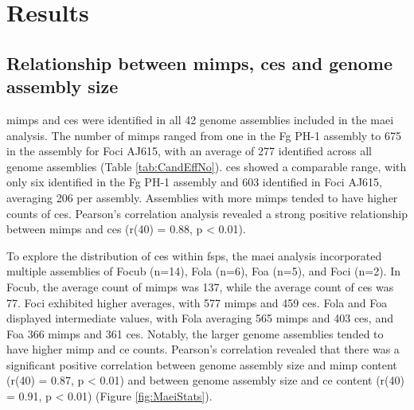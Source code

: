 \newpage
\section{Results}

\subsection{Relationship between \acp{mimp}, \acp{ce} and genome assembly size}

\Acp{mimp} and \acfp{ce} were identified in all 42 genome assemblies included in the \ac{maei} analysis. The number of \acp{mimp} ranged from one in the \ac{Fg} PH-1 assembly to 675 in the assembly for \ac{Foci} AJ615, with an average of 277 identified across all genome assemblies (Table \ref{tab:CandEffNo}). \Acp{ce} showed a comparable range, with only six identified in the \ac{Fg} PH-1 assembly and 603 identified in \ac{Foci} AJ615, averaging 206 per assembly. Assemblies with more \acp{mimp} tended to have higher counts of \acp{ce}. Pearson's correlation analysis revealed a strong positive relationship between \acp{mimp} and \acp{ce} (r(40) = 0.88, p < 0.01). 

\bigskip


To explore the distribution of \acp{ce} within \acp{fsp}, the \ac{maei} analysis incorporated multiple assemblies of \ac{Focub} (n=14), \ac{Fola} (n=6), \ac{Foa} (n=5), and \ac{Foci} (n=2). In \ac{Focub}, the average count of \acp{mimp} was 137, while the average count of \acp{ce} was 77. \ac{Foci} exhibited higher averages, with 577 \acp{mimp} and 459 \acp{ce}. \ac{Fola} and \ac{Foa} displayed intermediate values, with \ac{Fola} averaging 565 \acp{mimp} and 403 \acp{ce}, and \ac{Foa} 366 \acp{mimp} and 361 \acp{ce}. Notably, the larger genome assemblies tended to have higher \ac{mimp} and \ac{ce} counts. Pearson's correlation revealed that there was a significant positive correlation between genome assembly size and \ac{mimp} content (r(40) = 0.87, p < 0.01) and between genome assembly size and \ac{ce} content (r(40) = 0.91, p < 0.01) (Figure \ref{fig:MaeiStats}). 

